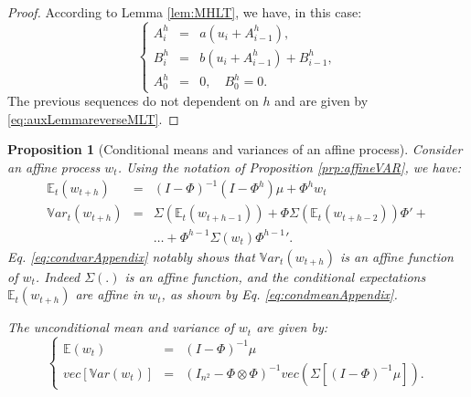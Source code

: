 \documentclass[
  12pt,
]{book}
\newtheorem{proposition}{Proposition}[chapter]
\theoremstyle{definition}
\theoremstyle{definition}
\theoremstyle{definition}
\theoremstyle{definition}
\theoremstyle{remark}
\begin{document}
\begin{proof}
According to Lemma \ref{lem:MHLT}, we have, in this case:
\[
\left\{
\begin{array}{ccl}
A^h_{i} &=& a(u_{i} + A^h_{i-1}), \\
B^h_{i} &=& b(u_{i} + A^h_{i-1}) + B^h_{i-1}, \\
A^h_{0} &=& 0, \quad B^h_{0} = 0.
\end{array}
\right.
\]
The previous sequences do not dependent on \(h\) and are given by \eqref{eq:auxLemmareverseMLT}.
\end{proof}

\begin{proposition}[Conditional means and variances of an affine process]
\protect\hypertarget{prp:condvarAffine}{}\label{prp:condvarAffine}Consider an affine process \(w_t\). Using the notation of Proposition \ref{prp:affineVAR}, we have:
\begin{eqnarray}
\mathbb{E}_t(w_{t+h}) &=& (I - \Phi)^{-1}(I - \Phi^h)\mu + \Phi^h w_t \label{eq:condmeanAppendix}\\
\mathbb{V}ar_t(w_{t+h}) &=& \Sigma(\mathbb{E}_t(w_{t+h-1}))+\Phi \Sigma(\mathbb{E}_t(w_{t+h-2}))\Phi' + \nonumber \\
&& \dots + \Phi^{h-1} \Sigma(w_{t}){\Phi^{h-1}}'. \label{eq:condvarAppendix}
\end{eqnarray}
Eq. \eqref{eq:condvarAppendix} notably shows that \(\mathbb{V}ar_t(w_{t+h})\) is an affine function of \(w_t\). Indeed \(\Sigma(.)\) is an affine function, and the conditional expectations \(\mathbb{E}_t(w_{t+h})\) are affine in \(w_t\), as shown by Eq. \eqref{eq:condmeanAppendix}.

The unconditional mean and variance of \(w_t\) are given by:
\begin{equation}
\left\{
\begin{array}{ccl}
\mathbb{E}(w_t) &=& (I - \Phi)^{-1}\mu\\
vec[\mathbb{V}ar(w_t)] &=& (I_{n^2} - \Phi \otimes \Phi)^{-1} vec\left(\Sigma[(I - \Phi)^{-1}\mu]\right).
\end{array}
\right.\label{eq:uncondmeanvarAppendix}
\end{equation}
\end{proposition}
\end{document}
